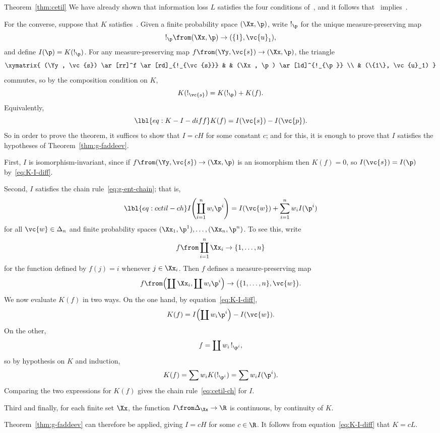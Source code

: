 \begin{pfof}{Theorem~\ref{thm:cetil}}
We have already shown that information loss $L$ satisfies the four
conditions of~, and it follows
that~ implies~.

For the converse, suppose that $K$ satisfies~.
Given a finite probability space $(\Xx, \p)$, write $!_{\p}$ for the unique
measure-preserving map
\[
!_{\p} \from (\Xx, \p) \to (\{1\}, \vc{u}_1),
\]
and define $I(\p) = K(!_{\p})$.  For any measure-preserving map $f \from
(\Yy, \vc{s}) \to (\Xx, \p)$, the triangle
\[
\xymatrix{
(\Yy, \vc{s}) \ar[rr]^f \ar[rd]_{!_{\vc{s}}}      &
&
(\Xx, \p) \ar[ld]^{!_{\p}}        \\
&
(\{1\}, \vc{u}_1)
}
\]
commutes, so by the composition condition on $K$,
\[
K(!_{\vc{s}}) = K(!_{\p}) + K(f).
\]
Equivalently,
% 
\begin{equation}
\lbl{eq:K-I-diff}
K(f) = I(\vc{s}) - I(\vc{p}).
\end{equation}
% 
So in order to prove the theorem, it suffices to show that $I = cH$ for
some constant $c$; and for this, it is enough to prove that $I$ satisfies
the hypotheses of Theorem~\ref{thm:g-faddeev}.

First, $I$ is isomorphism-invariant, since if $f\from (\Yy, \vc{s}) \to (\Xx,
\p)$ is an isomorphism then $K(f) = 0$, so $I(\vc{s}) = I(\p)$
by~\eqref{eq:K-I-diff}.  

Second, $I$ satisfies the chain rule~\eqref{eq:g-ent-chain}; that is,
% 
\begin{equation}
\lbl{eq:cetil-ch}
I\Biggl( \coprod_{i = 1}^n w_i \p^i \Biggr)
=
I(\vc{w}) + \sum_{i = 1}^n w_i I(\p^i)
\end{equation}
% 
for all $\vc{w} \in \Delta_n$ and finite probability spaces $(\Xx_1, \p^1),
\ldots, (\Xx_n, \p^n)$.  To see this, write
\[
f \from
\coprod_{i = 1}^n \Xx_i \to \{1, \ldots, n\}
\]
for the function defined by $f(j) = i$ whenever $j \in \Xx_i$.  Then $f$
defines a measure-preserving map
\[
f \from
\Bigl( \coprod \Xx_i, \coprod w_i \p^i \Bigr)
\to
\bigl( \{1, \ldots, n\}, \vc{w} \bigr).
\]
We now evaluate $K(f)$ in two ways.  On the one hand, by
equation~\eqref{eq:K-I-diff},
\[
K(f) =
I\Bigl( \coprod w_i \p^i \Bigr) - I(\vc{w}).
\]
On the other, 
\[
f = \coprod w_i \, !_{\p^i},
\]
so by hypothesis on $K$ and induction,
\[
K(f)
=
\sum w_i K(!_{\p^i})
=
\sum w_i I(\p^i).
\]
Comparing the two expressions for $K(f)$ gives the chain
rule~\eqref{eq:cetil-ch} for $I$.

Third and finally, for each finite set $\Xx$, the function $I \from
\Delta_\Xx \to \R$ is continuous, by continuity of $K$.

Theorem~\ref{thm:g-faddeev} can therefore be applied, giving $I = cH$ for some
$c \in \R$. It follows from equation~\eqref{eq:K-I-diff} that $K = cL$.
\end{pfof}

